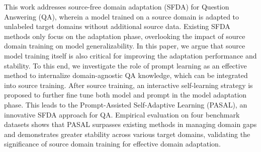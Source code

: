 This work addresses source-free domain adaptation (SFDA) for Question Answering (QA), wherein a model trained on a source domain is adapted to unlabeled target domains without additional source data. Existing SFDA methods only focus on the adaptation phase, overlooking the impact of source domain training on model generalizability. In this paper, we argue that source model training itself is also critical for improving the adaptation performance and stability. To this end, we investigate the role of prompt learning as an effective method to internalize domain-agnostic QA knowledge, which can be integrated into source training. After source training, an interactive self-learning strategy is proposed to further fine tune both model and prompt in the model adaptation phase. This leads to the Prompt-Assisted Self-Adaptive Learning (PASAL), an innovative SFDA approach for QA. Empirical evaluation on four benchmark datasets shows that PASAL surpasses existing methods in managing domain gaps and demonstrates greater stability across various target domains, validating the significance of source domain training for effective domain adaptation.